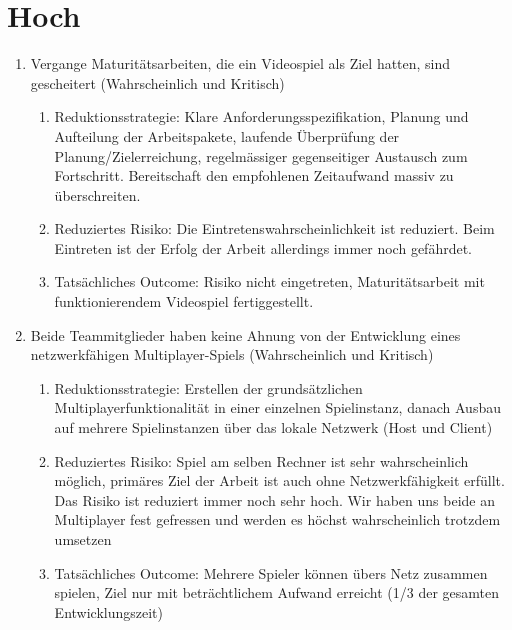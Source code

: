 \section{Hoch}
\begin{enumerate}
    \item Vergange Maturitätsarbeiten, die ein Videospiel als Ziel hatten, sind gescheitert (Wahrscheinlich und Kritisch)
    \begin{enumerate}
        \item Reduktionsstrategie: Klare Anforderungsspezifikation, Planung und Aufteilung der Arbeitspakete, laufende Überprüfung der Planung/Zielerreichung, regelmässiger gegenseitiger Austausch zum Fortschritt.
        Bereitschaft den empfohlenen Zeitaufwand massiv zu überschreiten.
        \item Reduziertes Risiko: Die Eintretenswahrscheinlichkeit ist reduziert. Beim Eintreten ist der Erfolg der Arbeit allerdings immer noch gefährdet.
        \item Tatsächliches Outcome: Risiko nicht eingetreten, Maturitätsarbeit mit funktionierendem Videospiel fertiggestellt.
    \end{enumerate}

    \item Beide Teammitglieder haben keine Ahnung von der Entwicklung eines netzwerkfähigen Multiplayer-Spiels (Wahrscheinlich und Kritisch)
    \begin{enumerate}
        \item Reduktionsstrategie: Erstellen der grundsätzlichen Multiplayerfunktionalität in einer einzelnen Spielinstanz, danach Ausbau auf mehrere Spielinstanzen über das lokale Netzwerk (Host und Client)
        \item Reduziertes Risiko: Spiel am selben Rechner ist sehr wahrscheinlich möglich, primäres Ziel der Arbeit ist auch ohne Netzwerkfähigkeit erfüllt.
            Das Risiko ist reduziert immer noch sehr hoch.
              Wir haben uns beide an Multiplayer fest gefressen und werden es höchst wahrscheinlich trotzdem umsetzen
        \item Tatsächliches Outcome: Mehrere Spieler können übers Netz zusammen spielen, Ziel nur mit beträchtlichem Aufwand erreicht (1/3 der gesamten Entwicklungszeit)
    \end{enumerate}


\end{enumerate}
